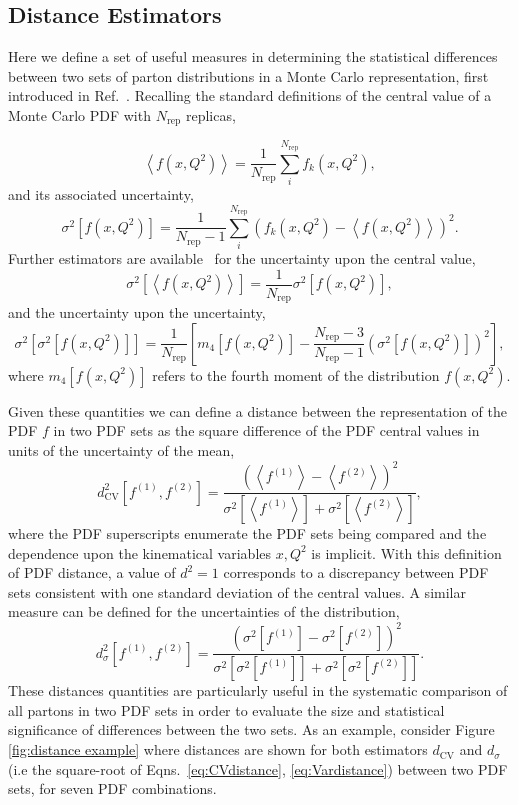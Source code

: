 \documentclass[12pt,oneside,openright]{report}
\newcommand{\be}{\begin{equation}}
\newcommand{\ee}{\end{equation}}
\begin{document}
\begin{spacing}{1.5}
\chapter{Distance Estimators}
\label{app:distances}
Here we define a set of useful measures in determining the statistical differences between two sets of parton distributions in a Monte Carlo representation, first introduced in Ref.~\cite{Ball:2010de}. Recalling the standard
definitions of the central value of a Monte Carlo PDF with $N_{\text{rep}}$ replicas,

\be \left< f (x,Q^2) \right> = \frac{1}{N_{\text{rep}}}\sum_i^{N_{\text{rep}}} f_k(x,Q^2), \ee
and its associated uncertainty,
\be \sigma^2\left[ f (x,Q^2) \right] = \frac{1}{N_{\text{rep}}-1}\sum_i^{N_{\text{rep}}} \left( f_k(x,Q^2) - \left<f(x,Q^2)\right>\right)^2.  \ee
Further estimators are available~\cite{Beringer:1900zz} for the uncertainty upon the central value,
\be \sigma^2\left[\left<f(x,Q^2)\right>\right] = \frac{1}{N_{\text{rep}}} \sigma^2\left[ f (x,Q^2) \right], \ee
and the uncertainty upon the uncertainty,
\be \sigma^2\left[\sigma^2\left[f(x,Q^2)\right]\right] = \frac{1}{N_{\text{rep}}} \left[ m_4\left[f(x,Q^2)\right] - \frac{N_{\text{rep}} - 3}{N_{\text{rep}} - 1} \left( \sigma^2\left[f(x,Q^2)\right] \right)^2 \right],\ee
where $m_4\left[f(x,Q^2)\right]$ refers to the fourth moment of the distribution $f(x,Q^2)$.

Given these quantities we can define a distance between the representation of the PDF $f$ in two PDF sets as the square difference of the PDF central values in units of the uncertainty of the mean,
\be d^2_{\text{CV}}\left[f^{(1)},f^{(2)}\right] = \frac{\left(\left<f^{(1)}\right> - \left<f^{(2)}\right> \right)^2}
{\sigma^2 \left[\left<f^{(1)}\right>\right] + \sigma^2 \left[\left<f^{(2)}\right>\right]},
\label{eq:CVdistance}
\ee
where the PDF superscripts enumerate the PDF sets being compared and the dependence upon the kinematical variables $x,Q^2$ is implicit. With this definition of PDF distance, a value of $d^2=1$ corresponds
to a discrepancy between PDF sets consistent with one standard deviation of the central values. A similar measure can be defined for the uncertainties of the distribution,
\be d^2_{\sigma}\left[f^{(1)},f^{(2)}\right] = \frac{\left(\sigma^2 \left[f^{(1)}\right] - \sigma^2 \left[f^{(2)}\right] \right)^2}
{\sigma^2 \left[\sigma^2 \left[f^{(1)}\right]\right] + \sigma^2 \left[\sigma^2 \left[f^{(2)}\right]\right]}.
\label{eq:Vardistance}
\ee
These distances quantities are particularly useful in the systematic comparison of all partons in two PDF sets in order to evaluate the size and statistical significance of differences between the two sets. As an example,
consider Figure \ref{fig:distance example} where distances are shown for both estimators $d_{\text{CV}}$ and $d_\sigma$ (i.e the square-root of Eqns.~\ref{eq:CVdistance}, \ref{eq:Vardistance}) between two PDF sets, for seven PDF combinations.


\end{spacing}
\end{document}
